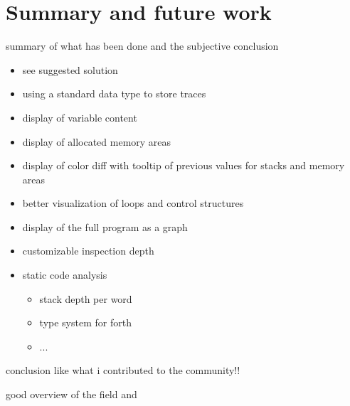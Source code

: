 \chapter{Summary and future work}

summary of what has been done and the subjective conclusion

\begin{itemize}
\item see suggested solution
\item using a standard data type to store traces
\item display of variable content
\item display of allocated memory areas
\item display of color diff with tooltip of previous values for stacks and memory areas
\item better visualization of loops and control structures
\item display of the full program as a graph
\item customizable inspection depth
\item static code analysis
\begin{itemize}
\item stack depth per word
\item type system for forth
\item ...
\end{itemize}
\end{itemize}


conclusion like what i contributed to the community!!

good overview of the field \cite{Canfora:2011:ACS:1924421.1924451} and \cite{Cornelissen2009}